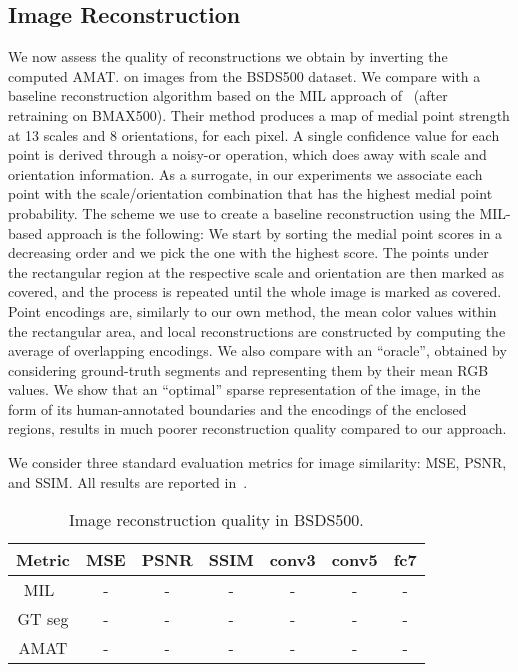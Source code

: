\documentclass[10pt,twocolumn,letterpaper]{article}
\begin{document}
\subsection{Image Reconstruction}\label{sec:experiments:reconstruction}
We now assess the quality of reconstructions we obtain by inverting the computed AMAT.
on images from the BSDS500 dataset.
We compare with a baseline reconstruction algorithm based on the MIL approach 
of~\cite{tsogkas2012learning} (after retraining on BMAX500).
Their method produces a map of medial point strength at 13 scales and 8 orientations, for each pixel.
A single confidence value for each point is derived through a noisy-or operation,
which does away with scale and orientation information.
As a surrogate, in our experiments we associate each point with the scale/orientation combination
that has the highest medial point probability.
The scheme we use to create a baseline reconstruction using the MIL-based approach is the following:
We start by sorting the medial point scores in a decreasing order and we pick the one with the highest score.
The points under the rectangular region at the respective scale and orientation are then marked as covered,
and the process is repeated until the whole image is marked as covered.
Point encodings are, similarly to our own method, the mean color values within the rectangular area, 
and local reconstructions are constructed by computing the average of overlapping encodings.
We also compare with an ``oracle'', obtained by considering ground-truth segments and representing
them by their mean RGB values.
We show that an ``optimal'' sparse representation of the image, in the form of its human-annotated
boundaries and the encodings of the enclosed regions, results in much poorer reconstruction
quality compared to our approach.

We consider three standard evaluation metrics for image similarity: MSE, PSNR, and SSIM.
All results are reported in~.



\begin{table}
\centering
\begin{tabular}{|c|c|c|c|c|c|c|}
\hline
Metric	&	MSE		&	PSNR	&	SSIM 	&	conv3	&	conv5	&	fc7	\\
\hline
MIL~\cite{tsogkas2012learning}	&	-	& - 	& 	- 	&	-	&	-	&	-	\\
\hline
GT seg &	-	& - 	& 	- 	&	-	&	-	&	-	\\
\hline
AMAT	&	-	&	-	&	-	&	-	&	-	&	- 	\\
\hline
\end{tabular}
\caption{Image reconstruction quality in BSDS500.}
\label{tab:reconstruction}
\end{table}
\end{document}
